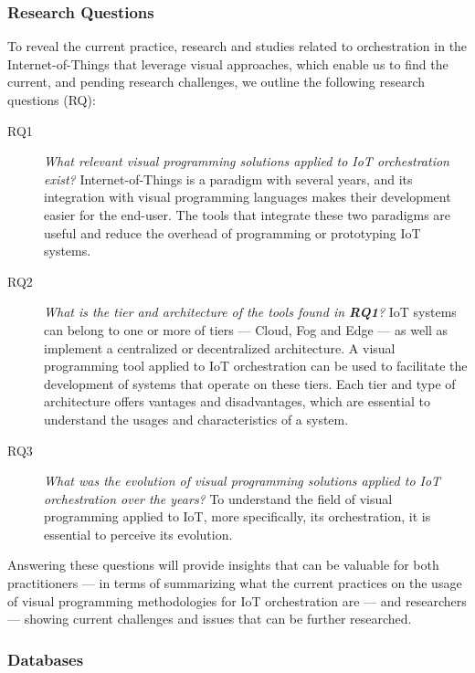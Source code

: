 \subsubsection{Research Questions}\label{sec:slr_research_questions}

To reveal the current practice, research and studies related to orchestration in the Internet-of-Things that leverage visual approaches, which enable us to find the current, and pending research challenges, we outline the following research questions (RQ):

\begin{description}
    \item[RQ1] \textit{What relevant visual programming solutions applied to IoT orchestration exist?} Internet-of-Things is a paradigm with several years, and its integration with visual programming languages makes their development easier for the end-user. The tools that integrate these two paradigms are useful and reduce the overhead of programming or prototyping IoT systems.
    \item[RQ2] \textit{What is the tier and architecture of the tools found in \textbf{RQ1}?} IoT systems can belong to one or more of tiers --- Cloud, Fog and Edge --- as well as implement a centralized or decentralized architecture. A visual programming tool applied to IoT orchestration can be used to facilitate the development of systems that operate on these tiers. Each tier and type of architecture offers vantages and disadvantages, which are essential to understand the usages and characteristics of a system.
    \item[RQ3] \textit{What was the evolution of visual programming solutions applied to IoT orchestration over the years?} To understand the field of visual programming applied to IoT, more specifically, its orchestration, it is essential to perceive its evolution.
\end{description}

Answering these questions will provide insights that can be valuable for both practitioners --- in terms of summarizing what the current practices on the usage of visual programming methodologies for IoT orchestration are --- and researchers --- showing current challenges and issues that can be further researched.

\subsubsection{Databases}\label{sec:databases}

